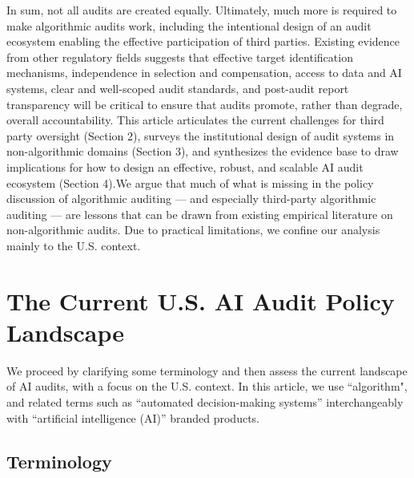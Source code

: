 \documentclass[sigconf]{acmart}
\begin{document}
In sum, not all audits are created equally. Ultimately, much more is required to make algorithmic audits work, including the intentional design of an audit ecosystem enabling the effective participation of third parties. Existing evidence from other regulatory fields suggests that effective target identification mechanisms, independence in selection and compensation, access to data and AI systems, clear and well-scoped audit standards, and post-audit report transparency will be critical to ensure that audits promote, rather than degrade, overall accountability. This article articulates the current challenges for third party oversight (Section 2), surveys the institutional design of audit systems in non-algorithmic domains (Section 3), and synthesizes the evidence base to draw implications for how to design an effective, robust, and scalable AI audit ecosystem (Section 4).We argue that much of what is missing in the policy discussion of algorithmic auditing — and especially third-party algorithmic auditing — are lessons that can be drawn from existing empirical literature on non-algorithmic audits. Due to practical limitations, we confine our analysis mainly to the U.S. context. 

\section{The Current U.S. AI Audit Policy Landscape}

We proceed by clarifying some terminology and then assess the current landscape of AI audits, with a focus on the U.S. context. In this article, we use ``algorithm", and related terms such as ``automated decision-making systems'' interchangeably with ``artificial intelligence (AI)'' branded products.

\subsection{Terminology}
\end{document}
